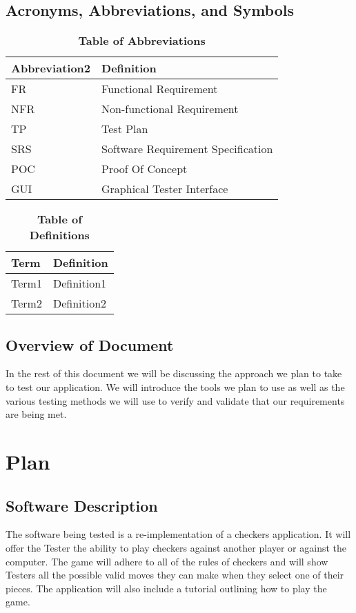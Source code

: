 \documentclass[12pt, titlepage]{article}
\begin{document}
\subsection{Acronyms, Abbreviations, and Symbols}
\begin{table}[hbp]
\caption{\textbf{Table of Abbreviations}} \label{Table}

\begin{tabularx}{\textwidth}{p{3cm}X}
\toprule
\textbf{Abbreviation2} & \textbf{Definition} \\
\midrule
FR & Functional Requirement\\
NFR & Non-functional Requirement\\
TP & Test Plan\\
SRS & Software Requirement Specification\\
POC & Proof Of Concept\\
GUI & Graphical Tester Interface\\
\bottomrule
\end{tabularx}

\end{table}

\begin{table}[!htbp]
\caption{\textbf{Table of Definitions}} \label{Table}

\begin{tabularx}{\textwidth}{p{3cm}X}
\toprule
\textbf{Term} & \textbf{Definition}\\
\midrule
Term1 & Definition1\\
Term2 & Definition2\\
\bottomrule
\end{tabularx}

\end{table}	

\subsection{Overview of Document}
In the rest of this document we will be discussing the approach we plan to take to test our application. We will introduce the tools we plan to use as well as the various testing methods we will use to verify and validate that our requirements are being met.
\section{Plan}
	
\subsection{Software Description}
The software being tested is a re-implementation of a checkers application. It will offer the Tester the ability to play checkers against another player or against the computer. The game will adhere to all of the rules of checkers and will show Testers all the possible valid moves they can make when they select one of their pieces. The application will also include a tutorial outlining how to play the game.
\end{document}
